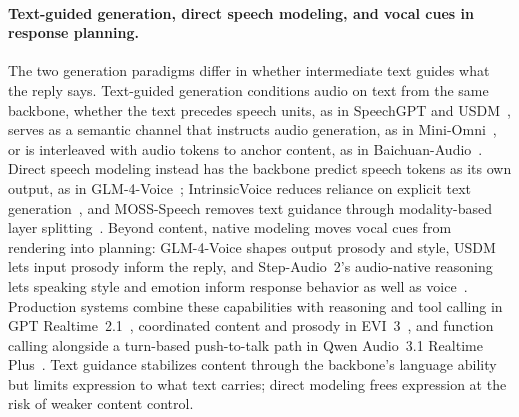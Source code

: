 \paragraph{Text-guided generation, direct speech modeling, and vocal cues in response planning.}
The two generation paradigms differ in whether intermediate text guides what the reply says. Text-guided generation conditions audio on text from the same backbone, whether the text precedes speech units, as in SpeechGPT and USDM~\citep{DBLP:conf/emnlp/ZhangLZZWZQ23,DBLP:conf/nips/KimSJKKKLSOHYY24}, serves as a semantic channel that instructs audio generation, as in Mini-Omni~\citep{DBLP:journals/corr/abs-2408-16725}, or is interleaved with audio tokens to anchor content, as in Baichuan-Audio~\citep{DBLP:journals/corr/abs-2502-17239}. Direct speech modeling instead has the backbone predict speech tokens as its own output, as in GLM-4-Voice~\citep{DBLP:journals/corr/abs-2412-02612}; IntrinsicVoice reduces reliance on explicit text generation~\citep{DBLP:journals/corr/abs-2410-08035}, and MOSS-Speech removes text guidance through modality-based layer splitting~\citep{DBLP:conf/iclr/ZhaoXJWCJCLCWZC26}. Beyond content, native modeling moves vocal cues from rendering into planning: GLM-4-Voice shapes output prosody and style, USDM lets input prosody inform the reply, and Step-Audio~2's audio-native reasoning lets speaking style and emotion inform response behavior as well as voice~\citep{DBLP:journals/corr/abs-2507-16632}. Production systems combine these capabilities with reasoning and tool calling in GPT Realtime~2.1~\citep{openai2026gptrealtime21}, coordinated content and prosody in EVI~3~\citep{cowen2025evi3}, and function calling alongside a turn-based push-to-talk path in Qwen Audio~3.1 Realtime Plus~\citep{alibaba2026qwenaudio31realtime}. Text guidance stabilizes content through the backbone's language ability but limits expression to what text carries; direct modeling frees expression at the risk of weaker content control.


